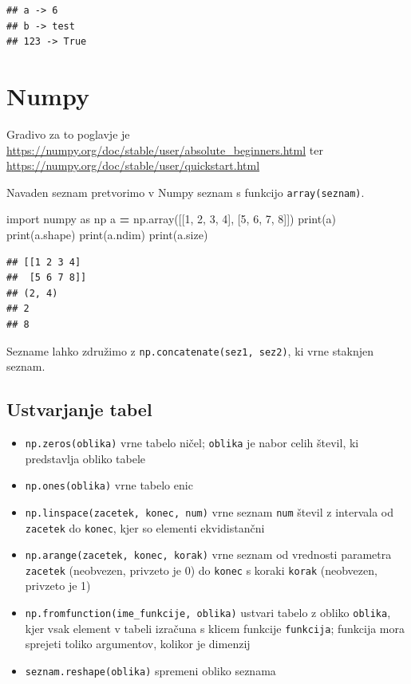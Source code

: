 \documentclass[
]{book}
\newenvironment{Shaded}{\begin{snugshade}}{\end{snugshade}}
\newcommand{\BuiltInTok}[1]{#1}
\newcommand{\DecValTok}[1]{\textcolor[rgb]{0.00,0.00,0.81}{#1}}
\newcommand{\ImportTok}[1]{#1}
\newcommand{\NormalTok}[1]{#1}
\newcommand{\OperatorTok}[1]{\textcolor[rgb]{0.81,0.36,0.00}{\textbf{#1}}}
\providecommand{\tightlist}{%
  \setlength{\itemsep}{0pt}\setlength{\parskip}{0pt}}
\begin{document}
\begin{verbatim}
## a -> 6
## b -> test
## 123 -> True
\end{verbatim}

\hypertarget{numpy-1}{%
\chapter{Numpy}\label{numpy-1}}

Gradivo za to poglavje je \url{https://numpy.org/doc/stable/user/absolute_beginners.html}
ter \url{https://numpy.org/doc/stable/user/quickstart.html}

Navaden seznam pretvorimo v Numpy seznam s funkcijo \texttt{array(seznam)}.

\begin{Shaded}
\begin{Highlighting}[]
\ImportTok{import}\NormalTok{ numpy }\ImportTok{as}\NormalTok{ np}
\NormalTok{a }\OperatorTok{=}\NormalTok{ np.array([[}\DecValTok{1}\NormalTok{, }\DecValTok{2}\NormalTok{, }\DecValTok{3}\NormalTok{, }\DecValTok{4}\NormalTok{], [}\DecValTok{5}\NormalTok{, }\DecValTok{6}\NormalTok{, }\DecValTok{7}\NormalTok{, }\DecValTok{8}\NormalTok{]])}
\BuiltInTok{print}\NormalTok{(a)}
\BuiltInTok{print}\NormalTok{(a.shape)}
\BuiltInTok{print}\NormalTok{(a.ndim)}
\BuiltInTok{print}\NormalTok{(a.size)}
\end{Highlighting}
\end{Shaded}

\begin{verbatim}
## [[1 2 3 4]
##  [5 6 7 8]]
## (2, 4)
## 2
## 8
\end{verbatim}

Sezname lahko združimo z \texttt{np.concatenate(sez1,\ sez2)}, ki vrne staknjen seznam.

\hypertarget{ustvarjanje-tabel}{%
\section{Ustvarjanje tabel}\label{ustvarjanje-tabel}}

\begin{itemize}
\tightlist
\item
  \texttt{np.zeros(oblika)} vrne tabelo ničel; \texttt{oblika} je nabor celih števil, ki predstavlja obliko tabele
\item
  \texttt{np.ones(oblika)} vrne tabelo enic
\item
  \texttt{np.linspace(zacetek,\ konec,\ num)} vrne seznam \texttt{num} števil z intervala od \texttt{zacetek} do \texttt{konec}, kjer so elementi ekvidistančni
\item
  \texttt{np.arange(zacetek,\ konec,\ korak)} vrne seznam od vrednosti parametra \texttt{zacetek} (neobvezen, privzeto je 0) do \texttt{konec} s koraki \texttt{korak} (neobvezen, privzeto je 1)
\item
  \texttt{np.fromfunction(ime\_funkcije,\ oblika)} ustvari tabelo z obliko \texttt{oblika}, kjer
  vsak element v tabeli izračuna s klicem funkcije \texttt{funkcija}; funkcija mora sprejeti toliko argumentov, kolikor je dimenzij
\item
  \texttt{seznam.reshape(oblika)} spremeni obliko seznama
\end{itemize}
\end{document}
